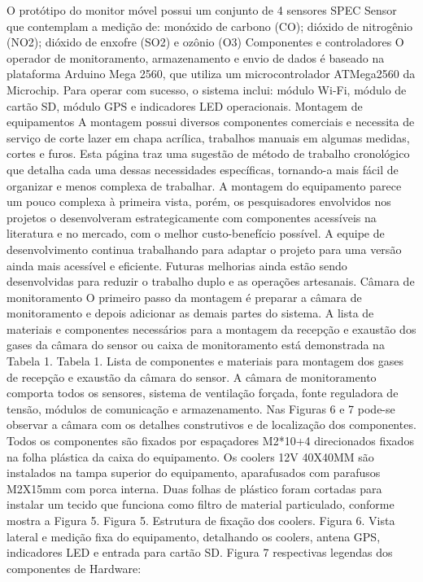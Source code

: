 O protótipo do monitor móvel possui um conjunto de 4 sensores SPEC Sensor que contemplam a medição de: monóxido de carbono (CO); dióxido de nitrogênio (NO2); dióxido de enxofre (SO2) e ozônio (O3)
Componentes e controladores
O operador de monitoramento, armazenamento e envio de dados é baseado na plataforma Arduino Mega 2560, que utiliza um microcontrolador ATMega2560 da Microchip. Para operar com sucesso, o sistema inclui: módulo Wi-Fi, módulo de cartão SD, módulo GPS e indicadores LED operacionais.
Montagem de equipamentos
A montagem possui diversos componentes comerciais e necessita de serviço de corte lazer em chapa acrílica, trabalhos manuais em algumas medidas, cortes e furos. Esta página traz uma sugestão de método de trabalho cronológico que detalha cada uma dessas necessidades específicas, tornando-a mais fácil de organizar e menos complexa de trabalhar.
A montagem do equipamento parece um pouco complexa à primeira vista, porém, os pesquisadores envolvidos nos projetos o desenvolveram estrategicamente com componentes acessíveis na literatura e no mercado, com o melhor custo-benefício possível.
A equipe de desenvolvimento continua trabalhando para adaptar o projeto para uma versão ainda mais acessível e eficiente. Futuras melhorias ainda estão sendo desenvolvidas para reduzir o trabalho duplo e as operações artesanais.
Câmara de monitoramento
O primeiro passo da montagem é preparar a câmara de monitoramento e depois adicionar as demais partes do sistema.
A lista de materiais e componentes necessários para a montagem da recepção e exaustão dos gases da câmara do sensor ou caixa de monitoramento está demonstrada na Tabela 1.
Tabela 1. Lista de componentes e materiais para montagem dos gases de recepção e exaustão da câmara do sensor.
A câmara de monitoramento comporta todos os sensores, sistema de ventilação forçada, fonte reguladora de tensão, módulos de comunicação e armazenamento.
Nas Figuras 6 e 7 pode-se observar a câmara com os detalhes construtivos e de localização dos componentes. Todos os componentes são fixados por espaçadores M2*10+4 direcionados fixados na folha plástica da caixa do equipamento.
Os coolers 12V 40X40MM são instalados na tampa superior do equipamento, aparafusados com parafusos M2X15mm com porca interna. Duas folhas de plástico foram cortadas para instalar um tecido que funciona como filtro de material particulado, conforme mostra a Figura 5.
Figura 5. Estrutura de fixação dos coolers.
Figura 6. Vista lateral e medição fixa do equipamento, detalhando os coolers, antena GPS, indicadores LED e entrada para cartão SD.
Figura 7 respectivas legendas dos componentes de Hardware:
